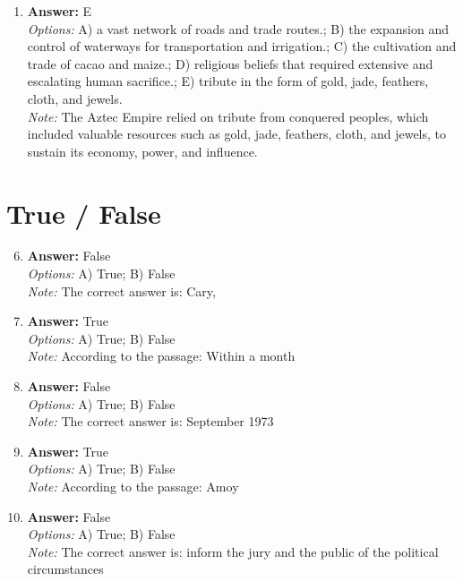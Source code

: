\documentclass[12pt]{article}
\begin{document}
\begin{enumerate}[label=\arabic*.]
\\ \textit{Note:} The depiction of military conquests on the stele illustrates the importance of warfare and territorial expansion in legitimizing the authority and status of Mayan kings like Yax Pahsaj.
\item \textbf{Answer:} E
\\ \textit{Options:} A) a vast network of roads and trade routes.; B) the expansion and control of waterways for transportation and irrigation.; C) the cultivation and trade of cacao and maize.; D) religious beliefs that required extensive and escalating human sacrifice.; E) tribute in the form of gold, jade, feathers, cloth, and jewels.
\\ \textit{Note:} The Aztec Empire relied on tribute from conquered peoples, which included valuable resources such as gold, jade, feathers, cloth, and jewels, to sustain its economy, power, and influence.
\end{enumerate}

\section*{True / False}
\begin{enumerate}[label=\arabic*.]
\setcounter{enumi}{5}
\item \textbf{Answer:} False
\\ \textit{Options:} A) True; B) False
\\ \textit{Note:} The correct answer is: Cary,
\item \textbf{Answer:} True
\\ \textit{Options:} A) True; B) False
\\ \textit{Note:} According to the passage: Within a month
\item \textbf{Answer:} False
\\ \textit{Options:} A) True; B) False
\\ \textit{Note:} The correct answer is: September 1973
\item \textbf{Answer:} True
\\ \textit{Options:} A) True; B) False
\\ \textit{Note:} According to the passage: Amoy
\item \textbf{Answer:} False
\\ \textit{Options:} A) True; B) False
\\ \textit{Note:} The correct answer is: inform the jury and the public of the political circumstances
\end{enumerate}
\end{document}
